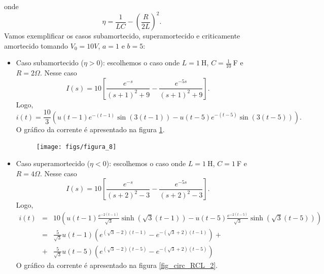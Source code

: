 \documentclass[a4paper,10pt]{book}
\begin{document}
 onde
 \begin{equation}
 \eta=\frac{1}{LC}-\left(\frac{R}{2L}\right)^2.
 \end{equation}
 Vamos exemplificar os casos subamortecido, superamortecido e criticamente amortecido tomando $V_0=10V$, $a=1$ e $b=5$:
 \begin{itemize}
  \item Caso subamortecido ($\eta>0$): escolhemos o caso onde $L=1\ \!$H, $C=\frac{1}{10}\ \!$F e $R=2\Omega$. Nesse caso
  \begin{equation}
  I(s)=10\left[\frac{e^{-s}}{\left(s+1\right)^2+9}-\frac{e^{-5s}}{\left(s+1\right)^2+9}\right].
  \end{equation}
  Logo,
  \begin{equation}
  i(t)=\frac{10}{3}\left(u(t-1)e^{-(t-1)}\sin\left(3 (t-1)\right)-u(t-5) e^{-(t-5)}\sin\left(3 (t-5)\right)\right).
  \end{equation}
  O gráfico da corrente é apresentado na figura \ref{fig_circ_RCL_1}.
 \begin{figure}[!ht]
 \begin{center}
% 
 \texttt{[image: figs/figura\_8]}\end{center}
 \caption{\label{fig_circ_RCL_1}}
 \end{figure}
  \item Caso superamortecido ($\eta<0$): escolhemos o caso onde $L=1\ \!$H, $C=1\ \!$F e $R=4\Omega$. Nesse caso
  \begin{equation}
  I(s)=10\left[\frac{e^{-s}}{\left(s+2\right)^2-3 }-\frac{e^{-5s}}{\left(s+2\right)^2-3}\right].
  \end{equation}
  Logo,
  \begin{eqnarray*}
  i(t)&=&10\left(u(t-1)\frac{e^{-2(t-1)}}{ \sqrt{3}}\sinh\left(\sqrt{3} (t-1)\right)-u(t-5)\frac{e^{-2(t-5)}}{\sqrt{3} }\sinh\left(\sqrt{3}  (t-5)\right)\right)\\
  &=&\frac{5}{\sqrt{3}}u(t-1)\left(e^{\left(\sqrt{3}-2\right) (t-1)}-e^{-\left(\sqrt{3}+2\right) (t-1)}\right)+\\
  &+&\frac{5}{\sqrt{3}}u(t-5)\left(e^{\left(\sqrt{3}-2\right) (t-5)}-e^{-\left(\sqrt{3}+2\right) (t-5)}\right)
  \end{eqnarray*}
  O gráfico da corrente é apresentado na figura \ref{fig_circ_RCL_2}.
 \begin{figure}[!ht]
 \begin{center}
 

\end{center}
\end{figure}
\end{itemize}
\end{document}
